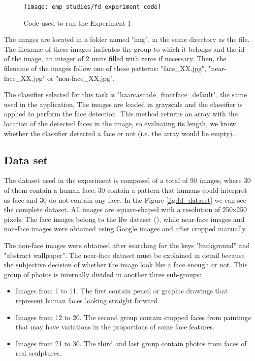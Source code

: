 	\begin{figure}[!ht]
		\centering
		\texttt{[image: emp\_studies/fd\_experiment\_code]}
		\caption{Code used to run the Experiment 1}
		\label{fig:fd_experiment_code}
	\end{figure}

	The images are located in a folder named "img", in the same directory as the file. The filename of these images indicates the group to which it belongs and the id of the image, an integer of 2 units filled with zeros if necessary. Then, the filename of the images follow one of these patterns: "face{\_}XX.jpg", "near-face{\_}XX.jpg" or "non-face{\_}XX.jpg".

	The classifier selected for this task is "haarcascade{\_}frontface{\_}default", the same used in the application. The images are loaded in grayscale and the classifier is applied to perform the face detection. This method returns an array with the location of the detected faces in the image, so evaluating its length, we know whether the classifier detected a face or not (i.e. the array would be empty). 

	\subsection{Data set}
	The dataset used in the experiment is composed of a total of 90 images, where 30 of them contain a human face, 30 contain a pattern that humans could interpret as face and 30 do not contain any face. In the Figure \ref{fig:fd_dataset} we can see the complete dataset. All images are square-shaped with a resolution of 250x250 pixels. The face images belong to the \gls{lfw} dataset (\cite{lfw_db}), while near-face images and non-face images were obtained using Google images and after cropped manually.

	The non-face images were obtained after searching for the keys "background" and "abstract wallpaper". The near-face dataset must be explained in detail because the subjective decision of whether the image look like a face enough or not. This group of photos is internally divided in another three sub-groups:

	\begin{itemize}
		\item Images from 1 to 11. The first contain pencil or graphic drawings that represent human faces looking straight forward.
		\item Images from 12 to 20. The second group contain cropped faces from paintings that may have variations in the proportions of some face features. 
		\item Images from 21 to 30. The third and last group contain photos from faces of real sculptures.
	\end{itemize}

